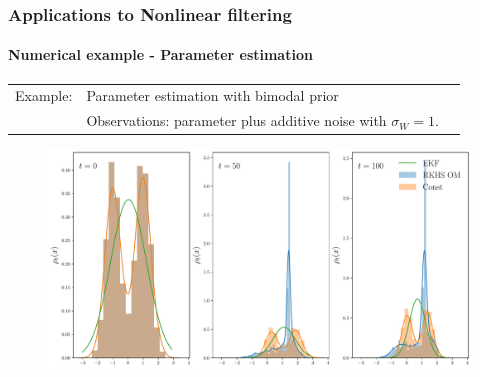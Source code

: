 \documentclass[xcolor=dvipsnames, subsection=false]{beamer}
\def\alertb#1{\alert{\color{BrickRed}  #1}}
\def\alertb#1{\alert{\color{BrickRed}  #1}}
\begin{document}
\begin{frame}
\begin{minipage}[t][6.5cm][t]{\textwidth}
\end{minipage}
\end{frame}

\begin{frame}
\frametitle{Applications to Nonlinear filtering}
\framesubtitle{Numerical example - Parameter estimation}
\begin{minipage}[t][6.5cm][t]{\textwidth}
	
	\begin{tabular}{lll}\alertb{Example:}   & Parameter estimation with bimodal prior
		\\
		&   Observations:  parameter plus additive noise with $\sigma_W = 1$.
	\end{tabular}
  \begin{figure}
  	\centering
	\includegraphics[width = 0.85\hsize] {Chap4_Posterior_estimate.pdf}
  \end{figure}
\end{minipage}
\end{frame}
\end{document}
